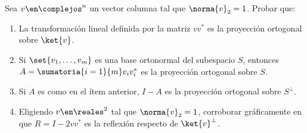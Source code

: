 \begin{enunciado}{\ejercicio}
  Sea $v \en \complejos^n$ un vector columna tal que $\norma{v}_2 = 1$. Probar que:
  \begin{enumerate}[label=(\alph*)]
    \item La transformación lineal definida por la matriz $vv^*$ es la proyección ortogonal sobre $\ket{v}$.

    \item Si $\set{v_1,\ldots,v_m}$ es una base ortonormal del subespacio $S$, entonces
          $A = \sumatoria{i=1}{m}v_iv_i^*$ es la proyección ortogonal sobre $S$.

    \item Si $A$ es como en el ítem anterior, $I-A$ es la proyección ortogonal sobre $S^\perp$.

    \item Eligiendo $v \en \reales^2$ tal que $\norma{v}_2 = 1$, corroborar gráficamente en \python que $R = I - 2vv^*$
          es la reflexión respecto de $\ket{v}^\perp$.
  \end{enumerate}
\end{enunciado}

